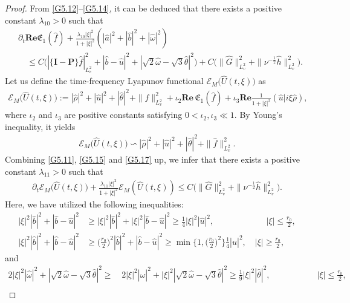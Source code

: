 \documentclass[reqno,11pt]{amsart}
\theoremstyle{plain}
\numberwithin{equation}{section}
\begin{document}
\begin{proof}
From   \eqref{G5.12}--\eqref{G5.14}, it can be deduced that there exists a positive constant $\lambda_{10} > 0$ such that 
\begin{align}\label{G5.17}
& \partial_t \mathbf{Re} \mathfrak{E}_1(\hat{f})+\frac{\lambda_{10}|\xi|^2}{1+|\xi|^2} (|\hat{a}|^2+|\hat{b}|^2+|\hat{\omega}|^2 )\nonumber \\
&\quad\leq C\big(|\{\mathbf{I}-\mathbf{P}\} \hat{f}|_{L_v^2}^2+|\hat{b}-\hat{u}|^2+|\sqrt{2} \hat{\omega}-\sqrt{3} \hat{\theta}|^2\big)+C\big(\|\hat{G}\|_{L_v^2}^2+\|\nu^{-\frac{1}{2}} \hat{h}\|_{L_v^2}^2\big).
\end{align}
Let us define the time-frequency Lyapunov functional ${\mathcal E}_{M}\big(\hat{U}(t,\xi)\big)$ as  
\begin{align*}  
{\mathcal E}_{M}\big(\hat{U}(t,\xi)\big) := |\hat{\rho}|^2 + |\hat{u}|^2 + |\hat{\theta}|^2 + \|\hat{f}\|_{L_v^2}^2 + \iota_2 \mathbf{Re}\, \mathfrak{E}_1(\hat{f}) + \iota_3 \mathbf{Re} \frac{1}{1+|\xi|^2} (\hat{u}|i \xi \hat{\rho}),  
\end{align*}  
where $\iota_2$ and $\iota_3$ are positive constants satisfying $0 < \iota_2, \iota_3 \ll 1$. By Young's inequality, it yields  
\begin{align*}
{\mathcal E}_{M}\big(\hat{U}(t,\xi)\big)\backsim    |\hat{\rho}|^2 + |\hat{u}|^2 + |\hat{\theta}|^2 + \|\hat{f}\|_{L_v^2}^2. 
\end{align*}
Combining \eqref{G5.11}, \eqref{G5.15} and \eqref{G5.17} up, we infer that there exists a positive constant $\lambda_{11} > 0$ such that 
\begin{align}\label{G5.18}
\partial_{t}\mathcal{E}_{M}\big(\hat{U}(t,\xi)\big)+\frac{\lambda_{11}|\xi|^{2}}{1+|\xi|^{2}}
\mathcal{E}_{M}(\hat{U}(t,\xi))\leq C\big(\|\hat{G}\|_{L_{v}^{2}}^{2}
+\|\nu^{-\frac{1}{2}}\hat{h}\|_{L_{v}^{2}}^{2}\big).
\end{align}
Here, we have utilized the following inequalities: 
\begin{align*}  
|\xi|^2|\hat{b}|^2 + |\hat{b} - \hat{u}|^2 &\geq |\xi|^2|\hat{b}|^2 + |\xi|^2|\hat{b} - \hat{u}|^2 \geq \frac{1}{4}|\xi|^2|\hat{u}|^2, \qquad\qquad\quad\quad\, |\xi| \leq \frac{r_0}{2}, \\  
|\xi|^2|\hat{b}|^2 + |\hat{b} - \hat{u}|^2 &\geq \Big(\frac{r_0}{2}\Big)^2|\hat{b}|^2 + |\hat{b} - \hat{u}|^2 \geq \min\Big\{1, \Big(\frac{r_0}{2}\Big)^2\Big\}\frac{1}{4}|\hat{u}|^2, \quad |\xi| \geq \frac{r_0}{2},  
\end{align*}  
and
\begin{align*}  
2|\xi|^2|\hat{\omega}|^2 + |\sqrt{2}\hat{\omega} - \sqrt{3}\hat{\theta}|^2 \geq&\, 2|\xi|^2|\hat{\omega}|^2 + |\xi|^2|\sqrt{2}\hat{\omega} - \sqrt{3}\hat{\theta}|^2  \geq  \frac{1}{9}|\xi|^2|\hat{\theta}|^2, \quad\qquad\qquad\,\,\,  |\xi| \leq \frac{r_0}{2}, \\  

\end{align*}
\end{proof}
\end{document}
